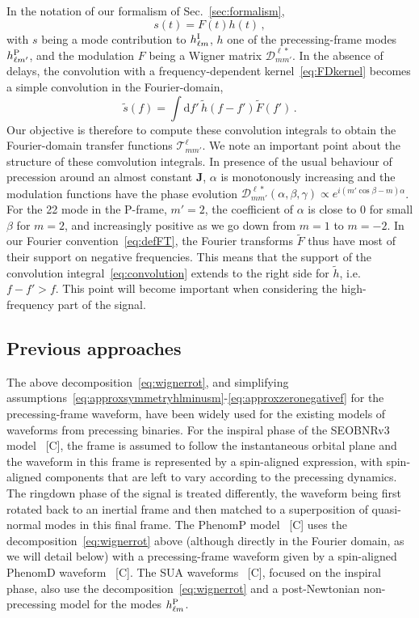 \documentclass[aps,showpacs,twocolumn,
prd,superscriptaddress,nofootinbib]{revtex4-1}
\newcommand{\be}{\begin{equation}}
\newcommand{\ee}{\end{equation}}
\newcommand\ud{{\mathrm{d}}}
\newcommand\calT{{\mathcal{T}}}
\newcommand\calD{{\mathcal{D}}}
\newcommand{\SM}[1]{{\color{Red} #1}}
\begin{document}
In the notation of our formalism of Sec.~\ref{sec:formalism}, 
\be\label{eq:defmodulationprec}
	s(t) = F(t) h(t) \,,
\ee
with $s$ being a mode contribution to $h^{\rm I}_{\ell m}$, $h$ one of the precessing-frame modes $h^{\rm P}_{\ell m'}$, and the modulation $F$ being a Wigner matrix $\calD^{\ell *}_{mm'}$. In the absence of delays, the convolution with a frequency-dependent kernel~\eqref{eq:FDkernel} becomes a simple convolution in the Fourier-domain,
\be\label{eq:convolution}
	\tilde{s} (f) = \int \ud f' \, \tilde{h}(f-f') \tilde{F} (f') \,.
\ee
Our objective is therefore to compute these convolution integrals to obtain the Fourier-domain transfer functions $\calT^{\ell}_{mm'}$. We note an important point about the structure of these comvolution integrals. In presence of the usual behaviour of precession around an almost constant $\bm{J}$, $\alpha$ is monotonously increasing and the modulation functions have the phase evolution $\calD^{\ell *}_{mm'} (\alpha, \beta, \gamma) \propto e^{i(m' \cos\beta - m) \alpha}$. For the 22 mode in the P-frame, $m'=2$, the coefficient of $\alpha$ is close to $0$ for small $\beta$ for $m=2$, and increasingly positive as we go down from $m=1$ to $m=-2$. In our Fourier convention~\eqref{eq:defFT}, the Fourier transforms $\tilde{F}$ thus have most of their support on negative frequencies. This means that the support of the convolution integral~\eqref{eq:convolution} extends to the right side for $\tilde{h}$, i.e. $f-f' > f$. This point will become important when considering the high-frequency part of the signal.

\subsection{Previous approaches}
\label{subsec:precpreviousapproaches}

The above decomposition~\eqref{eq:wignerrot}, and simplifying assumptions~\eqref{eq:approxsymmetryhlminusm}-\eqref{eq:approxzeronegativef} for the precessing-frame waveform, have been widely used for the existing models of waveforms from precessing binaries. For the inspiral phase of the SEOBNRv3 model~\cite{} \SM{[C]}, the frame is assumed to follow the instantaneous orbital plane and the waveform in this frame is represented by a spin-aligned expression, with spin-aligned components that are left to vary according to the precessing dynamics. The ringdown phase of the signal is treated differently, the waveform being first rotated back to an inertial frame and then matched to a superposition of quasi-normal modes in this final frame. The PhenomP model~\cite{} \SM{[C]} uses the decomposition~\eqref{eq:wignerrot} above (although directly in the Fourier domain, as we will detail below) with a precessing-frame waveform given by a spin-aligned PhenomD waveform~\cite{} \SM{[C]}. The SUA waveforms~\cite{} \SM{[C]}, focused on the inspiral phase, also use the decomposition~\eqref{eq:wignerrot} and a post-Newtonian non-precessing model for the modes $h_{\ell m}^{\rm P}$.
\end{document}
